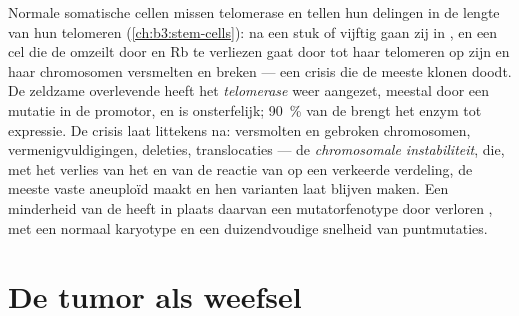 \begin{definition}\label{def:b3:cancer-biology:telomerase}
Normale somatische cellen missen telomerase en tellen hun delingen in
de lengte van hun telomeren (\cref{ch:b3:stem-cells}): na een stuk of
vijftig gaan zij in , en een cel die de  omzeilt
door  en Rb te verliezen gaat door tot haar telomeren op zijn en
haar chromosomen versmelten en breken --- een crisis die de meeste
klonen doodt. De zeldzame overlevende heeft het \emph{telomerase} weer
aangezet, meestal door een mutatie in de promotor, en is onsterfelijk;
\qty{90}{\%} van de  brengt het enzym tot expressie. De crisis
laat littekens na: versmolten en gebroken chromosomen,
vermenigvuldigingen, deleties, translocaties --- de \emph{chromosomale
instabiliteit}, die, met het verlies van het  en van de reactie van  op een verkeerde verdeling, de
meeste vaste  aneuploïd maakt en hen varianten laat blijven
maken. Een minderheid van de  heeft in plaats daarvan een
mutatorfenotype door verloren , met een normaal karyotype
en een duizendvoudige snelheid van puntmutaties.
\end{definition}

\section{De tumor als weefsel}

